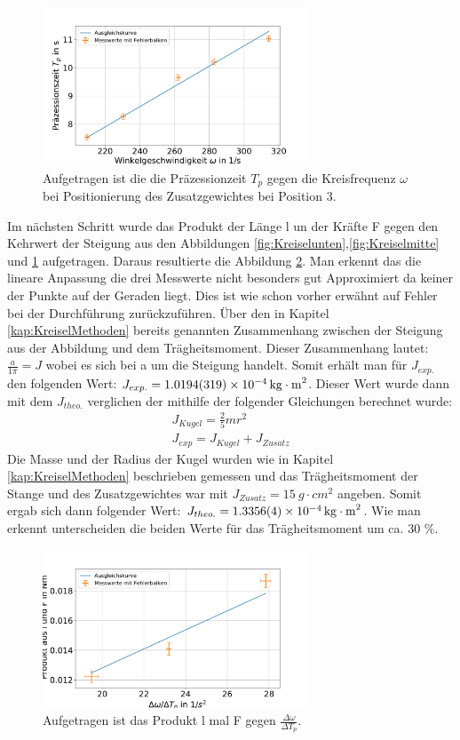 \begin{figure}[h]
	\centering
	\includegraphics[width=0.7\textwidth]{res/sproHzoben.pdf}
	\caption{Aufgetragen ist die die Präzessionzeit $T_p$ gegen die Kreisfrequenz $\omega$ bei Positionierung des Zusatzgewichtes bei Position 3.}
		\label{fig:Kreiseloben}
	\end{figure}
Im nächsten Schritt wurde das Produkt der Länge l un der Kräfte F gegen den Kehrwert der Steigung aus den Abbildungen \ref{fig:Kreiselunten},\ref{fig:Kreiselmitte} und \ref{fig:Kreiseloben} aufgetragen. 
Daraus resultierte die Abbildung \ref{fig:Kreisel}.
Man erkennt das die lineare Anpassung die drei Messwerte nicht besonders gut Approximiert da keiner der Punkte auf der Geraden liegt. Dies ist wie schon vorher erwähnt auf Fehler bei der Durchführung zurückzuführen.
Über den in Kapitel \ref{kap:KreiselMethoden} bereits genannten Zusammenhang zwischen der Steigung aus der Abbildung und dem Trägheitsmoment.
Dieser Zusammenhang lautet: $\frac{a}{1\pi}=J$ wobei es sich bei a um die Steigung handelt. Somit erhält man für $J_{exp.}$ den folgenden Wert: $J_{exp.}=\SI{1,0194+-0,0319e-4}{kg \cdot m^2}$. Dieser Wert wurde dann mit dem $J_{theo.}$ verglichen der mithilfe der folgender Gleichungen berechnet wurde:
\begin{align}
	J_{Kugel}=\frac{2}{5}mr^2\\
	J_{exp}=J_{Kugel}+J_{Zusatz}
	\label{eq:J}
\end{align}
Die Masse und der Radius der Kugel wurden wie in Kapitel \ref{kap:KreiselMethoden} beschrieben gemessen und das Trägheitsmoment der Stange und des Zusatzgewichtes war mit $J_{Zusatz}=\SI{15}{g \cdot cm^2}$ angeben. Somit ergab sich dann folgender Wert: $J_{theo.}=\SI{1,3356+-0,0004e-4}{kg \cdot m^2}$. Wie man erkennt unterscheiden die beiden Werte für das Trägheitsmoment um ca. 30 \%.
\begin{figure}[h]
	\centering
	\includegraphics[width=0.7\textwidth]{res/wtgegenlF.pdf}
	\caption{Aufgetragen ist das Produkt l mal F gegen $\frac{\Delta \omega}{\Delta T_p }$.} 
	\label{fig:Kreisel}
\end{figure}
